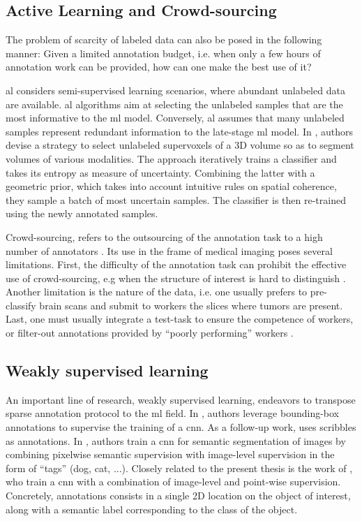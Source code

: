 \subsection{Active Learning and Crowd-sourcing}
The problem of scarcity of labeled data can also be posed in the following manner:
Given a limited annotation budget, i.e. when only a few hours of annotation work can be provided, how can one make the best use of it?

\gls{al} \cite{settles09} considers semi-supervised learning scenarios, where abundant unlabeled data are available.
\gls{al} algorithms aim at selecting the unlabeled samples that are the most informative to the \gls{ml} model.
Conversely, \gls{al} assumes that many unlabeled samples represent redundant information to the late-stage \gls{ml} model.
In \cite{KonSznFua15}, authors devise a strategy to select unlabeled supervoxels of a 3D volume so as to segment volumes of various modalities.
The approach iteratively trains a classifier and takes its entropy as measure of uncertainty.
Combining the latter with a geometric prior, which takes into account intuitive rules on spatial coherence, they sample a batch of most uncertain samples.
The classifier is then re-trained using the newly annotated samples.

Crowd-sourcing, refers to the outsourcing of the annotation task to a high number of annotators \cite{orting19}.
Its use in the frame of medical imaging poses several limitations.
First, the difficulty of the annotation task can prohibit the effective use of crowd-sourcing, e.g when the structure of interest is hard to distinguish \cite{orting19}.
Another limitation is the nature of the data, i.e. one usually prefers to pre-classify brain scans and submit to workers the slices where tumors are present.
Last, one must usually integrate a test-task to ensure the competence of workers, or filter-out annotations provided by ``poorly performing'' workers \cite{park18}.

\subsection{Weakly supervised learning}
An important line of research, weakly supervised learning, endeavors to transpose sparse annotation protocol to the \gls{ml} field.
In \cite{dai15}, authors leverage bounding-box annotations to supervise the training of a \gls{cnn}.
As a follow-up work, \cite{lin16} uses scribbles as annotations.
In \cite{papandreou15}, authors train a \gls{cnn} for semantic segmentation of images by combining pixelwise semantic supervision with image-level supervision in the form of ``tags'' (dog, cat, ...).
Closely related to the present thesis is the work of \cite{bearman16}, who train a \gls{cnn} with a combination of image-level and point-wise supervision.
Concretely, annotations consists in a single 2D location on the object of interest, along with a semantic label corresponding to the class of the object.

